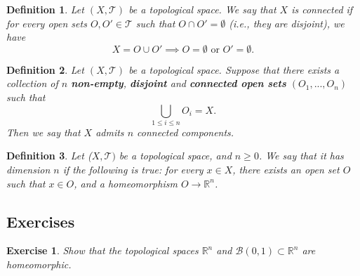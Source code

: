 \documentclass[a4paper,11pt]{article}
\theoremstyle{mytheor}
\newtheorem{definition}{Definition}[subsection]
\theoremstyle{mytheor}
\newtheorem{exercise}{Exercise}
\theoremstyle{remark}
\newcommand{\T}{\mathcal{T}}
\newcommand{\B}{\mathcal{B}}
\newcommand{\R}{\mathbb{R}}
\begin{document}
\begin{definition}
    Let $(X, \T)$ be a topological space. We say that $X$ is connected if for
    every open sets $O, O' \in \T$ such that $O \cap O' = \emptyset$ (i.e.,
    they are disjoint), we have
    $$X = O \cup O' \implies O = \emptyset \text{ or } O' = \emptyset.$$
\end{definition}

\begin{definition}
    Let $(X, \T)$ be a topological space. Suppose that there exists a
    collection of $n$ \textbf{non-empty}, \textbf{disjoint} and
    \textbf{connected open sets} $(O_1, ..., O_n)$ such that
    $$
    \bigcup_{1 \le i \le n} O_i = X.
    $$
    Then we say that $X$ admits $n$ connected components.
\end{definition}

\begin{definition}
    Let ($X, \T)$ be a topological space, and $n \geq 0$. We say that it has
    dimension $n$ if the following is true: for every $x \in X$, there exists
    an open set $O$ such that $x \in O$, and a homeomorphism $O \to \R^n$.
\end{definition}

\subsection{Exercises}

\begin{exercise}
    Show that the topological spaces $\R^n$ and $\B(0, 1) \subset \R^n$ are homeomorphic.
\end{exercise}
\end{document}
